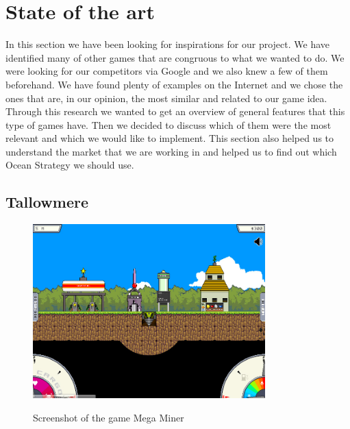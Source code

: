\documentclass[12p]{article}
\begin{document}

\newpage
\section{State of the art}

In this section we have been looking for inspirations for our project. We have identified many of other games that are congruous to what we wanted to do.
We were looking for our competitors via Google and we also knew a few of them beforehand. We have found plenty of examples on the Internet and we chose the ones that are, in our opinion, the most similar and related to our game idea. Through this research we wanted to get an overview of general features that this type of games have. Then we decided to discuss which of them were the most relevant and which we would like to implement. This section also helped us to understand the market that we are working in and helped us to find out which Ocean Strategy we should use.


\subsection{Tallowmere} \label{StateOfTheArt_Tallowmere}

\begin{figure}[ht]
    \center
    \includegraphics[width=0.8\textwidth]{StateOfTheArtScreenshots/mega_miner}
    \label{StateOfTheArt_Screenshots_Tallowmere}
    \caption{Screenshot of the game Mega Miner \cite{MegaMinerScreenshot}}
\end{figure}
\end{document}
